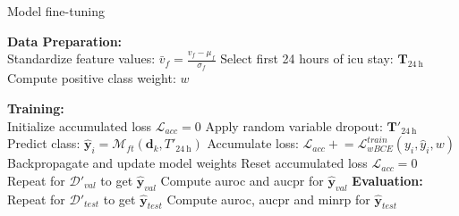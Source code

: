 \begin{algorithm}[h]
\caption{Model fine-tuning}
\label{algorighm:finetune}

\textbf{Data Preparation:} \\
\nl Standardize feature values: \(\bar{v}_f = \frac{v_f - \mu_f}{\sigma_f}\) \label{alg:finetune_start}\;
\nl Select first 24 hours of \gls{icu} stay: \( \mathbf{T}_{\qty{24}{\hour}} \) 
\nl Compute positive class weight: \(w\) 

\textbf{Training:} \\
 {
    \nl Initialize accumulated loss \(\mathcal{L}_{acc} = 0\) \;
     {
        \nl Apply random variable dropout: \( \mathbf{T}'_{\qty{24}{\hour}} \) 
        \nl Predict class: \(\hat{\mathbf{y}}_i = \mathcal{M}_{ft}(\mathbf{d}_k, T'_{\qty{24}{\hour}} )\) \; \label{alg:finetune_prediction}
        \nl Accumulate loss: \(\mathcal{L}_{acc} \mathrel{+} = \mathcal{L}^{train}_{wBCE} (y_i, \hat{y}_i, w) \)  \label{alg:finetune_compute_loss}
         {
            \nl Backpropagate and update model weights \;
            \nl Reset accumulated loss \(\mathcal{L}_{acc} = 0\) \;
        }
    }
    \nl Repeat  for \(\mathcal{D}'_{val}\) to get \(\hat{\mathbf{y}}_{val}\) \;
    \nl Compute \gls{auroc} and \gls{aucpr} for \(\hat{\mathbf{y}}_{val}\) \;
}
\textbf{Evaluation:} \\
\nl Repeat  for \(\mathcal{D}'_{test}\) to get \(\hat{\mathbf{y}}_{test}\) \;
\nl Compute \gls{auroc}, \gls{aucpr} and \gls{minrp} for \(\hat{\mathbf{y}}_{test}\) \;
\end{algorithm}
